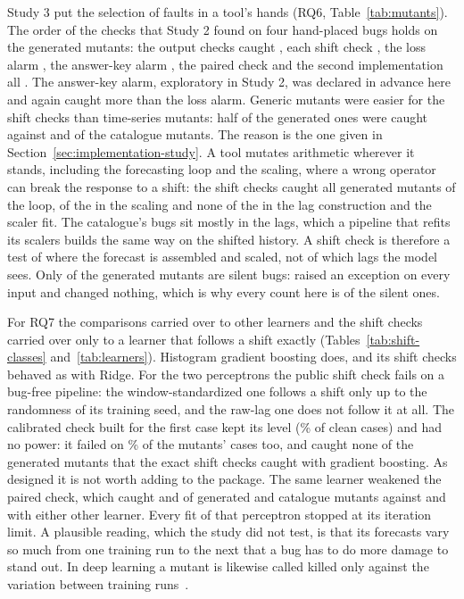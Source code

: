 \documentclass[11pt,a4paper]{article}
\begin{document}
Study 3 put the selection of faults in a tool's hands (RQ6,
Table~\ref{tab:mutants}). The order of the checks that Study 2 found on
four hand-placed bugs holds on the \ThirdSilent{} generated mutants: the
output checks caught \ThirdOutputCaught{}, each shift check
\ThirdShiftCaught{}, the loss alarm \ThirdLossCaught{}, the answer-key
alarm \ThirdKeyCaught{}, the paired check \ThirdPairedCaught{} and the
second implementation all \ThirdSecondCaught{}. The answer-key alarm,
exploratory in Study 2, was declared in advance here and again caught
more than the loss alarm. Generic mutants were easier for the shift
checks than time-series mutants: half of the generated ones were caught
against \ThirdCatalogueShiftCaught{} and
\ThirdCatalogueSeriesShiftCaught{} of the \ThirdCatalogueSilent{}
catalogue mutants. The reason is the one given in
Section~\ref{sec:implementation-study}. A tool mutates arithmetic
wherever it stands, including the forecasting loop and the scaling, where
a wrong operator can break the response to a shift: the shift checks
caught all \ThirdLoopMutants{} generated mutants of the loop,
\ThirdScalingShiftCaught{} of the \ThirdScalingMutants{} in the scaling
and none of the \ThirdLagMutants{} in the lag construction and the scaler
fit. The catalogue's bugs sit mostly in the lags, which a pipeline that
refits its scalers builds the same way on the shifted history. A shift
check is therefore a test of where the forecast is assembled and scaled,
not of which lags the model sees. Only \ThirdSilent{} of the
\ThirdGenerated{} generated mutants are silent bugs: \ThirdCrashing{}
raised an exception on every input and \ThirdEquivalent{} changed nothing,
which is why every count here is of the silent ones.

For RQ7 the comparisons carried over to other learners and the shift
checks carried over only to a learner that follows a shift exactly
(Tables~\ref{tab:shift-classes} and~\ref{tab:learners}). Histogram
gradient boosting does, and its shift checks behaved as with Ridge. For
the two perceptrons the public shift check fails on a bug-free pipeline:
the window-standardized one follows a shift only up to the randomness of
its training seed, and the raw-lag one does not follow it at all. The
calibrated check built for the first case kept its level
(\ThirdCalibratedCleanPercent{}\% of clean cases) and had no power: it
failed on \ThirdCalibratedMutantPercent{}\% of the mutants' cases too,
and caught none of the \ThirdBoostingShiftCaught{} generated mutants that
the exact shift checks caught with gradient boosting. As designed it is
not worth adding to the package. The same learner weakened the
paired check, which caught \ThirdWindowPairedCaught{} and
\ThirdWindowCataloguePairedCaught{} of \ThirdLearnerMutants{} generated
and catalogue mutants against \ThirdOtherPairedCaught{} and
\ThirdOtherCataloguePairedCaught{} with either other learner. Every fit
of that perceptron stopped at its iteration limit. A plausible reading,
which the study did not test, is that its forecasts vary so much from one
training run to the next that a bug has to do more damage to stand out.
In deep learning a mutant is likewise called killed only against the
variation between training runs~\cite{jahangirova2020empirical}.
\end{document}
